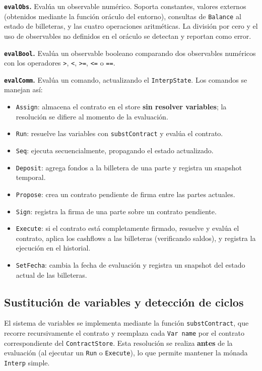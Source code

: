 \documentclass[a4paper, 12pt]{article}
\begin{document}
\textbf{\texttt{evalObs}.} Evalúa un observable numérico. Soporta constantes, valores externos (obtenidos mediante la función oráculo del entorno), consultas de \texttt{Balance} al estado de billeteras, y las cuatro operaciones aritméticas. La división por cero y el uso de observables no definidos en el oráculo se detectan y reportan como error.

\textbf{\texttt{evalBool}.} Evalúa un observable booleano comparando dos observables numéricos con los operadores \texttt{>}, \texttt{<}, \texttt{>=}, \texttt{<=} o \texttt{==}.

\textbf{\texttt{evalComm}.} Evalúa un comando, actualizando el \texttt{InterpState}. Los comandos se manejan así:
\begin{itemize}[nosep]
    \item \texttt{Assign}: almacena el contrato en el store \textbf{sin resolver variables}; la resolución se difiere al momento de la evaluación.
    \item \texttt{Run}: resuelve las variables con \texttt{substContract} y evalúa el contrato.
    \item \texttt{Seq}: ejecuta secuencialmente, propagando el estado actualizado.
    \item \texttt{Deposit}: agrega fondos a la billetera de una parte y registra un snapshot temporal.
    \item \texttt{Propose}: crea un contrato pendiente de firma entre las partes actuales.
    \item \texttt{Sign}: registra la firma de una parte sobre un contrato pendiente.
    \item \texttt{Execute}: si el contrato está completamente firmado, resuelve y evalúa el contrato, aplica los cashflows a las billeteras (verificando saldos), y registra la ejecución en el historial.
    \item \texttt{SetFecha}: cambia la fecha de evaluación y registra un snapshot del estado actual de las billeteras.
\end{itemize}

\subsection{Sustitución de variables y detección de ciclos}

El sistema de variables se implementa mediante la función \texttt{substContract}, que recorre recursivamente el contrato y reemplaza cada \texttt{Var name} por el contrato correspondiente del \texttt{ContractStore}. Esta resolución se realiza \textbf{antes} de la evaluación (al ejecutar un \texttt{Run} o \texttt{Execute}), lo que permite mantener la mónada \texttt{Interp} simple.
\end{document}
